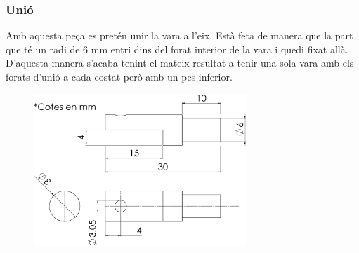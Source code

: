 \documentclass[a4paper, 12pt]{article}
\begin{document}
\subsubsection{Unió}
Amb aquesta peça es pretén unir la vara a l'eix. Està feta de manera que la part que té un radi de 6 mm entri dins del forat interior de la vara i quedi fixat allà. D'aquesta manera s'acaba tenint el mateix resultat a tenir una sola vara amb els forats d'unió a cada costat però amb un pes inferior.
\begin{figure}[h!]
\centering
\includegraphics[width=8cm]{./sketch/unio}
\end{figure}


\newpage
\end{document}
